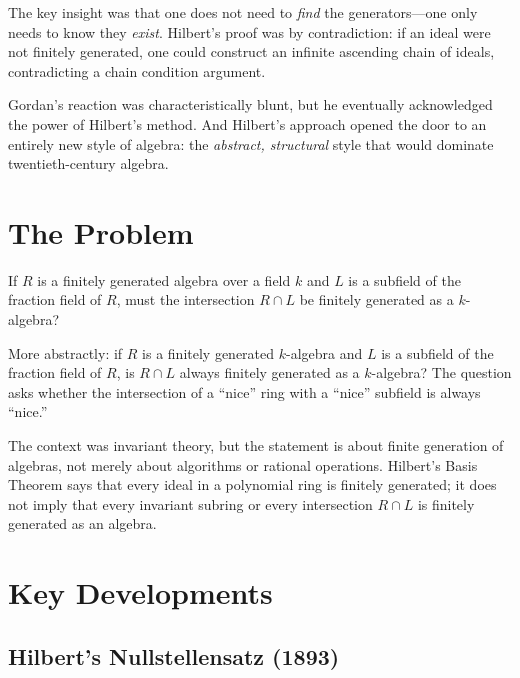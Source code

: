 The key insight was that one does not need to \emph{find} the generators---one only needs to know they \emph{exist}. Hilbert's proof was by contradiction: if an ideal were not finitely generated, one could construct an infinite ascending chain of ideals, contradicting a chain condition argument.

Gordan's reaction was characteristically blunt, but he eventually acknowledged the power of Hilbert's method. And Hilbert's approach opened the door to an entirely new style of algebra: the \emph{abstract, structural} style that would dominate twentieth-century algebra.

\section{The Problem}

\begin{problem_statement}
If $R$ is a finitely generated algebra over a field $k$ and $L$ is a subfield of the fraction field of $R$, must the intersection $R \cap L$ be finitely generated as a $k$-algebra?
\end{problem_statement}

More abstractly: if $R$ is a finitely generated $k$-algebra and $L$ is a subfield of the fraction field of $R$, is $R \cap L$ always finitely generated as a $k$-algebra? The question asks whether the intersection of a ``nice'' ring with a ``nice'' subfield is always ``nice.''

The context was invariant theory, but the statement is about finite generation of algebras, not merely about algorithms or rational operations. Hilbert's Basis Theorem says that every ideal in a polynomial ring is finitely generated; it does not imply that every invariant subring or every intersection $R\cap L$ is finitely generated as an algebra.

\section{Key Developments}

\subsection{Hilbert's Nullstellensatz (1893)}

